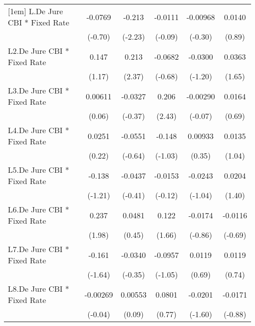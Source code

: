 {\begin{longtable}{l*{5}{c}}
[1em]
L.De Jure CBI * Fixed Rate&  -0.0769         &   -0.213\sym{*}  &  -0.0111         & -0.00968         &   0.0140         \\
                &  (-0.70)         &  (-2.23)         &  (-0.09)         &  (-0.30)         &   (0.89)         \\
[1em]
L2.De Jure CBI * Fixed Rate&    0.147         &    0.213\sym{*}  &  -0.0682         &  -0.0300         &   0.0363         \\
                &   (1.17)         &   (2.37)         &  (-0.68)         &  (-1.20)         &   (1.65)         \\
[1em]
L3.De Jure CBI * Fixed Rate&  0.00611         &  -0.0327         &    0.206\sym{*}  & -0.00290         &   0.0164         \\
                &   (0.06)         &  (-0.37)         &   (2.43)         &  (-0.07)         &   (0.69)         \\
[1em]
L4.De Jure CBI * Fixed Rate&   0.0251         &  -0.0551         &   -0.148         &  0.00933         &   0.0135         \\
                &   (0.22)         &  (-0.64)         &  (-1.03)         &   (0.35)         &   (1.04)         \\
[1em]
L5.De Jure CBI * Fixed Rate&   -0.138         &  -0.0437         &  -0.0153         &  -0.0243         &   0.0204         \\
                &  (-1.21)         &  (-0.41)         &  (-0.12)         &  (-1.04)         &   (1.40)         \\
[1em]
L6.De Jure CBI * Fixed Rate&    0.237\sym{*}  &   0.0481         &    0.122         &  -0.0174         &  -0.0116         \\
                &   (1.98)         &   (0.45)         &   (1.66)         &  (-0.86)         &  (-0.69)         \\
[1em]
L7.De Jure CBI * Fixed Rate&   -0.161         &  -0.0340         &  -0.0957         &   0.0119         &   0.0119         \\
                &  (-1.64)         &  (-0.35)         &  (-1.05)         &   (0.69)         &   (0.74)         \\
[1em]
L8.De Jure CBI * Fixed Rate& -0.00269         &  0.00553         &   0.0801         &  -0.0201         &  -0.0171         \\
                &  (-0.04)         &   (0.09)         &   (0.77)         &  (-1.60)         &  (-0.88)         \\
[1em]

\end{longtable}}
